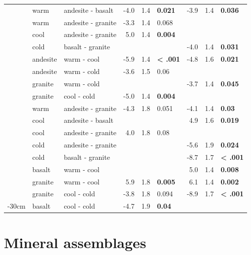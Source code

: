 \documentclass[english,man,floatsintext]{apa6}
\begin{document}
\begin{longtable}[t]{lllrrlrrl}
\endfoot
\bottomrule
\endlastfoot
 & warm & andesite - basalt & -4.0 & 1.4 & \textbf{0.021} & -3.9 & 1.4 & \textbf{0.036}\\
\nopagebreak
 & warm & andesite - granite & -3.3 & 1.4 & 0.068 &  &  & \\
\nopagebreak
 & cool & andesite - granite & 5.0 & 1.4 & \textbf{0.004} &  &  & \\
\nopagebreak
 & cold & basalt - granite &  &  &  & -4.0 & 1.4 & \textbf{0.031}\\
\nopagebreak
 & andesite & warm - cool & -5.9 & 1.4 & \textbf{< .001} & -4.8 & 1.6 & \textbf{0.021}\\
\nopagebreak
 & andesite & warm - cold & -3.6 & 1.5 & 0.06 &  &  & \\
\nopagebreak
 & granite & warm - cold &  &  &  & -3.7 & 1.4 & \textbf{0.045}\\
\nopagebreak
\multirow[t]{-8}{*}{\raggedright\arraybackslash 0-10cm} & granite & cool - cold & -5.0 & 1.4 & \textbf{0.004} &  &  & \\
\cmidrule{1-9}\pagebreak[0]
 & warm & andesite - granite & -4.3 & 1.8 & 0.051 & -4.1 & 1.4 & \textbf{0.03}\\
\nopagebreak
 & cool & andesite - basalt &  &  &  & 4.9 & 1.6 & \textbf{0.019}\\
\nopagebreak
 & cool & andesite - granite & 4.0 & 1.8 & 0.08 &  &  & \\
\nopagebreak
 & cold & andesite - granite &  &  &  & -5.6 & 1.9 & \textbf{0.024}\\
\nopagebreak
 & cold & basalt - granite &  &  &  & -8.7 & 1.7 & \textbf{< .001}\\
\nopagebreak
 & basalt & warm - cool &  &  &  & 5.0 & 1.4 & \textbf{0.008}\\
\nopagebreak
 & granite & warm - cool & 5.9 & 1.8 & \textbf{0.005} & 6.1 & 1.4 & \textbf{0.002}\\
\nopagebreak
\multirow[t]{-8}{*}{\raggedright\arraybackslash 10-20cm} & granite & cool - cold & -3.8 & 1.8 & 0.094 & -8.9 & 1.7 & \textbf{< .001}\\
\cmidrule{1-9}\pagebreak[0]
20-30cm & basalt & cool - cold & -4.7 & 1.9 & \textbf{0.04} &  &  & \\*
\end{longtable}
\endgroup{}

\hypertarget{mineral-assemblages}{%
\section{Mineral assemblages}\label{mineral-assemblages}}
\end{document}

